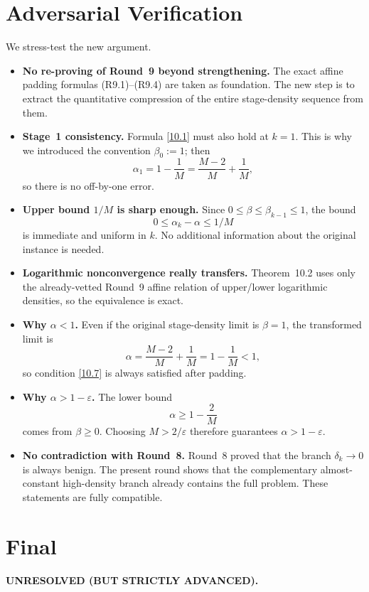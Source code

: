 \section{Adversarial Verification}
We stress-test the new argument.
\begin{itemize}
\item \textbf{No re-proving of Round~9 beyond strengthening.}  The exact affine padding formulas (R9.1)--(R9.4) are taken as foundation.  The new step is to extract the quantitative compression of the entire stage-density sequence from them.

\item \textbf{Stage~1 consistency.}  Formula \eqref{10.1} must also hold at $k=1$.  This is why we introduced the convention $\beta_0:=1$; then
\[
\alpha_1=1-\frac1M=\frac{M-2}{M}+\frac1M,
\]
so there is no off-by-one error.

\item \textbf{Upper bound $1/M$ is sharp enough.}  Since $0\le \beta\le \beta_{k-1}\le 1$, the bound
\[
0\le \alpha_k-\alpha\le 1/M
\]
is immediate and uniform in $k$.  No additional information about the original instance is needed.

\item \textbf{Logarithmic nonconvergence really transfers.}  Theorem~10.2 uses only the already-vetted Round~9 affine relation of upper/lower logarithmic densities, so the equivalence is exact.

\item \textbf{Why $\alpha<1$.}  Even if the original stage-density limit is $\beta=1$, the transformed limit is
\[
\alpha=\frac{M-2}{M}+\frac1M=1-\frac1M<1,
\]
so condition \eqref{10.7} is always satisfied after padding.

\item \textbf{Why $\alpha>1-\varepsilon$.}  The lower bound
\[
\alpha\ge 1-\frac{2}{M}
\]
comes from $\beta\ge 0$.  Choosing $M>2/\varepsilon$ therefore guarantees $\alpha>1-\varepsilon$.

\item \textbf{No contradiction with Round~8.}  Round~8 proved that the branch $\delta_k\to 0$ is always benign.  The present round shows that the complementary almost-constant high-density branch already contains the full problem.  These statements are fully compatible.
\end{itemize}

\section{Final}
\textbf{UNRESOLVED (BUT STRICTLY ADVANCED).}

